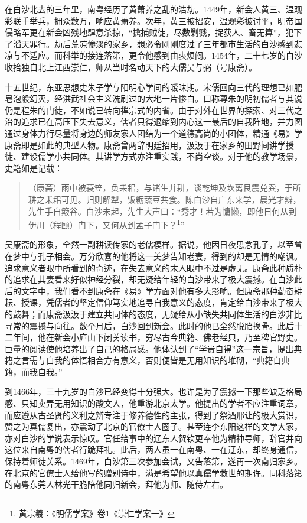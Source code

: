 在白沙北去的三年里，南粤经历了黄萧养之乱的浩劫。1449年，新会人黄三、温观彩联手举兵，拥众数万，响应黄萧养。次年，黄三被招安，温观彩被讨平，明帝国侵略军更在新会凶残地肆意杀掠，“擒捕贼徒，尽数剿戮，捉获人、畜无算”，犯下了滔天罪行。劫后荒凉惨淡的家乡，想必令刚刚度过了三年都市生活的白沙感到悲凉与不适应。而科举的接连落第，更令他感到由衷烦闷。1454年，二十七岁的白沙收拾独自北上江西崇仁，师从当时名动天下的大儒吴与弼（号康斋）。

十五世纪，东亚思想史朱子学与阳明心学间的暧昧期。宋儒回向三代的理想已如肥皂泡般幻灭，经洪武社会主义洗刷过的大地一片惨白。口称尊朱的明初儒者与其说仍是程朱的门徒，不如说已转向禅宗式的内省。由于对外在世界的探索、对三代之治的追求已在高压下失去意义，儒者只得退缩到内心这一最后的自我阵地，并力图通过身体力行尽量将身边的师友家人团结为一个道德高尚的小团体，精通《易》学康斋即是如此的典型人物。康斋曾两辞明廷招用，汲汲于在家乡的田野间讲学授徒、建设儒学小共同体。其讲学方式亦注重实践，不尚空谈。对于他的教学场景，史籍如是记载：

\begin{quote}

（康斋）雨中被蓑笠，负耒耜，与诸生并耕，谈乾坤及坎离艮震兑巽，于所耕之耒耜可见。归则解犁，饭粝蔬豆共食。陈白沙自广东来学，晨光才辨，先生手自簸谷。白沙未起，先生大声曰：“秀才！若为慵懒，即他日何从到伊川（程颐）门下，又何从到孟子门下？\footnote{黄宗羲：《明儒学案》卷1《崇仁学案一》}”

\end{quote}

吴康斋的形象，全然一副耕读传家的老儒模样。据说，他因日夜思念孔子，以至曾在梦中与孔子相会。万分欣喜的他将这一美梦告知老妻，得到的却是无情的嘲讽。追求意义者眼中所看到的奇迹，在失去意义的末人眼中不过是虚无。康斋此种质朴的追求在其妻看来好似神经分裂，却无疑给年轻的白沙带来了极大震撼。在白沙此后的文字中，我们看不到康斋在《易》学方面对他有多大影响。但康斋那种勤奋耕耘、授课，凭儒者的坚定信仰笃实地追寻自我意义的态度，肯定给白沙带来了极大的鼓舞；而康斋汲汲于建立共同体的态度，无疑给从小缺失共同体生活的白沙非比寻常的震撼与向往。数个月后，白沙回到新会。此时的他已全然脱胎换骨。此后十二年间，他在新会小庐山下闭关读书，穷尽古今典籍、佛老经典，乃至稗官野史。巨量的阅读使他培养出了自己的格局感。他体认到了“学贵自得”这一宗旨，提出典籍之言需与自我的体悟相合方有意义，否则便皆是无用知识的堆砌，“典籍自典籍，而我自我。”

到1466年，三十九岁的白沙已经变得十分强大。也许是为了震撼一下那些缺乏格局感、只知卖弄无用知识的酸文人，他重游北京太学。他提出的学者不应注重词章，而应遵从古圣贤的义利之辨专注于修养德性的主张，得到了祭酒邢让的极大赏识，赞之为真儒复出，亦震动了北京的官僚士人圈子。甚至连李东阳这样的文学大家，亦对白沙的学说表示惊叹。官任给事中的辽东人贺钦更奉他为精神导师，辞官并向这位来自南粤的儒者行跪拜礼。此后，两人虽一在南粤、一在辽东，却终身通信，保持着师徒关系。1469年，白沙第三次参加会试，又告落第，遂再一次南归家乡。在北京的官僚士人给他写的赠别诗中，满是希望他以真儒学救世的期许。同科落第的南粤东莞人林光干脆陪他同归新会，拜他为师、随侍左右。

